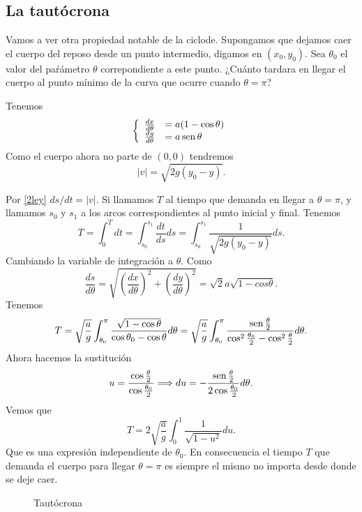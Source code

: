 \begin{subappendices}
\section{La tautócrona}







  Vamos a ver otra propiedad notable de la ciclode. Supongamos que dejamos caer el cuerpo del reposo desde un punto intermedio, digamos en $(x_0,y_0)$. Sea  $\theta_0$
 el valor del paŕámetro $\theta$ correpondiente a este punto. ¿Cuánto tardara en llegar el cuerpo al punto mínimo de la curva que ocurre cuando $\theta=\pi$? 


  
  

 Tenemos
\[
 \left\{ \begin{array}{l l}
 \frac{dx}{d\theta}&=a(1-\cos\theta)\\
 \frac{dy}{d\theta}&=a\sen\theta 
 \end{array}\right.
\]
% 
Como el cuerpo ahora no parte de $(0,0)$ tendremos
\[|v|=\sqrt{2g(y_0-y)}.\]


  
Por \eqref{2ley} $ds/dt=|v|$. Si llamamos $T$ al tiempo que demanda en llegar a $\theta=\pi$, y llamamos  $s_0$ y $s_1$ a los arcos correspondientes al punto inicial
y final.  Tenemos
 \[T=\int_0^Tdt=\int_{s_0}^{s_1}\frac{dt}{ds}ds=\int_{s_0}^{s_1}\frac{1}{\sqrt{2g(y_0-y)}}ds.\]
Cambiando la variable de integración a $\theta$. Como 
\[
 \frac{ds}{d\theta}=\sqrt{\left(\frac{dx}{d\theta}\right)^2+\left(\frac{dy}{d\theta}\right)^2}=\sqrt{2}a\sqrt{1-cos\theta}.
\]
 Tenemos
\[T=\sqrt{\frac{a}{g}}\int_{\theta_0}^{\pi}\frac{\sqrt{1-\cos\theta}}{\cos\theta_0-\cos\theta}d\theta=
\sqrt{\frac{a}{g}}\int_{\theta_0}^{\pi}\frac{\sen\frac{\theta}{2}}{\cos^2\frac{\theta_0}{2}-\cos^2\frac{\theta}{2}}d\theta.
\]
Ahora hacemos la sustitución
\[u=\frac{\cos\frac{\theta}{2}}{\cos\frac{\theta_0}{2}}\Longrightarrow du=-\frac{\sen\frac{\theta}{2}}{2\cos\frac{\theta_0}{2}}d\theta.\]
Vemos que
\[
 T=2\sqrt{\frac{a}{g}}\int_0^1\frac{1}{\sqrt{1-u^2}}du.
\]
Que es una expresión independiente de $\theta_0$. En consecuencia el tiempo $T$ que demanda  el cuerpo para llegar $\theta=\pi$ es siempre el mismo no importa
desde donde se deje caer.

\begin{figure}[h]
\begin{center}
\end{center}\caption{Tautócrona}\label{fig:tautocrona}
\end{figure}

\end{subappendices}


  
  
%
